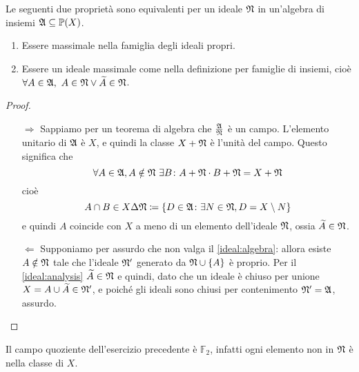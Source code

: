 \documentclass[../EserciziIstituzioniAnalisi.tex]{subfiles}
\begin{document}
\begin{exercise}[13/10/2016]
  Le seguenti due proprietà sono equivalenti per un ideale $\mathfrak N$ in un'algebra di insiemi $\mathfrak A \subseteq \mathbb P(X)$.
  \begin{enumerate}
    \item \label{ideal:algebra} Essere massimale nella famiglia degli ideali propri. 
    \item \label{ideal:analysis} Essere un ideale massimale come nella definizione per famiglie di insiemi, cioè $\forall A\in \mathfrak A,\ A\in\mathfrak N \lor \widetilde{A}\in\mathfrak N$.
  \end{enumerate}
\end{exercise}
\begin{proof}
  \begin{itemize}
    \item[$\Rightarrow$] Sappiamo per un teorema di algebra che $\frac{\mathfrak A}{\mathfrak N}$ è un campo. L'elemento unitario di $\mathfrak A$ è $X$, e quindi la classe $X+\mathfrak N$ è l'unità del campo.  
    Questo significa che
    \begin{equation*}
      \forall A \in \mathfrak A, A \notin \mathfrak N\ \exists B \colon A+\mathfrak N \cdot B+\mathfrak N = X+\mathfrak N
    \end{equation*}
    cioè
    \begin{equation*}
      A \cap B \in X \Delta \mathfrak N \coloneqq \{D\in \mathfrak A \colon \exists N\in \mathfrak N, D = X\setminus N \}
    \end{equation*}
    e quindi $A$ coincide con $X$ a meno di un elemento dell'ideale $\mathfrak N$, ossia $\widetilde{A}\in \mathfrak N$.
    
    \item[$\Leftarrow$] Supponiamo per assurdo che non valga il \cref{ideal:algebra}: allora esiste $A\notin \mathfrak N$ tale che l'ideale $\mathfrak N'$ generato da $\mathfrak N\cup \{A\}$ è proprio. Per il \cref{ideal:analysis} $\widetilde{A}\in \mathfrak N$ e quindi, dato che un ideale è chiuso per unione $X=A\cup\widetilde{A}\in \mathfrak N'$, e poiché gli ideali sono chiusi per contenimento $\mathfrak N'=\mathfrak A$, assurdo.
  \end{itemize}
\end{proof}
\begin{remark}
  Il campo quoziente dell'esercizio precedente è $\mathbb{F}_2$, infatti ogni elemento non in $\mathfrak N$ è nella classe di $X$.
\end{remark}
\end{document}
